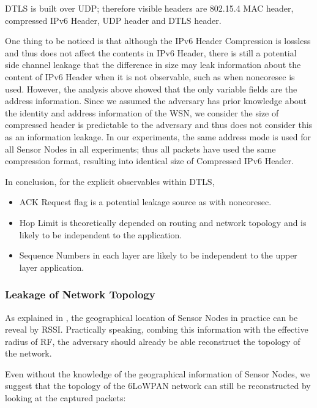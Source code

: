 DTLS is built over UDP; therefore visible headers are 802.15.4 MAC header, compressed IPv6 Header, UDP header and DTLS header.

One thing to be noticed is that although the IPv6 Header Compression is lossless and thus does not affect the contents in IPv6 Header, there is still a potential side channel leakage that the difference in size may leak information about the content of IPv6 Header when it is not observable, such as when noncoresec is used. However, the analysis above showed that the only variable fields are the address information. Since we assumed the adversary has prior knowledge about the identity and address information of the WSN, we consider the size of compressed header is predictable to the adversary and thus does not consider this as an information leakage. In our experiments, the same address mode is used for all Sensor Nodes in all experiments; thus all packets have used the same compression format, resulting into identical size of Compressed IPv6 Header.



In conclusion, for the explicit observables within DTLS,

\begin{itemize}
	\item ACK Request flag is a potential leakage source as with noncoresec.
	\item Hop Limit is theoretically depended on routing and network topology and is likely to be independent to the application.
	\item Sequence Numbers in each layer are likely to be independent to the upper layer application.
\end{itemize}

\subsubsection{Leakage of Network Topology}

As explained in , the geographical location of Sensor Nodes in practice can be reveal by RSSI. Practically speaking, combing this information with the effective radius of RF, the adversary should already be able reconstruct the topology of the network.

Even without the knowledge of the geographical information of Sensor Nodes, we suggest that the topology of the 6LoWPAN network can still be reconstructed by looking at the captured packets:


